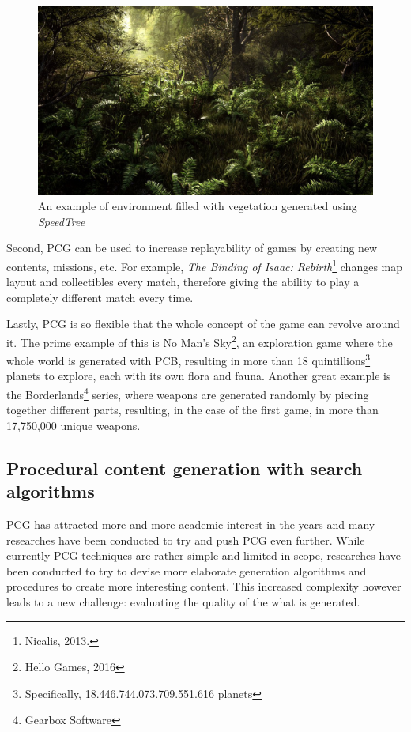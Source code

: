 \begin{figure}
\centering
\includegraphics[width=0.8\linewidth]{Images/images/SpeedTree.jpg}
\caption{An example of environment filled with vegetation generated using \textit{SpeedTree}}
\end{figure}

Second, PCG can be used to increase replayability of games by creating new contents, missions, etc. For example, \textit{The Binding of Isaac: Rebirth}\footnote{Nicalis, 2013.} changes map layout and collectibles every match, therefore giving the ability to play a completely different match every time.

Lastly, PCG is so flexible that the whole concept of the game can revolve around it. The prime example of this is No Man’s Sky\footnote{Hello Games, 2016}, an exploration game where the whole world is generated with PCB, resulting in more than 18 quintillions\footnote{Specifically, 18.446.744.073.709.551.616 planets}  planets to explore, each with its own flora and fauna. Another great example is the Borderlands\footnote{Gearbox Software} series, where weapons are generated randomly by piecing together different parts, resulting, in the case of the first game, in more than 17,750,000 unique weapons.

\subsection{Procedural content generation with search algorithms}
PCG has attracted more and more academic interest in the years and many researches have been conducted to try and push PCG even further. While currently PCG techniques are rather simple and limited in scope, researches have been conducted to try to devise more elaborate generation algorithms and procedures to create more interesting content. This increased complexity however leads to a new challenge: evaluating the quality of the what is generated. 

